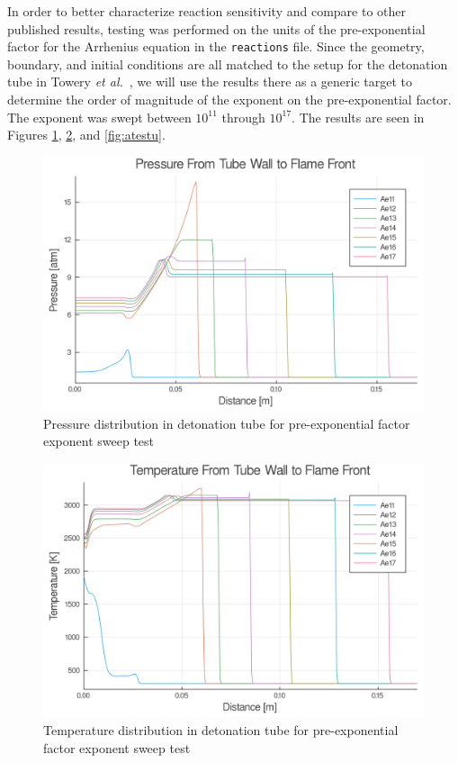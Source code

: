 In order to better characterize reaction sensitivity and compare to other published results, testing was performed on the units of the pre-exponential factor for the Arrhenius equation in the \verb|reactions| file. Since the geometry, boundary, and initial conditions are all matched to the setup for the detonation tube in Towery \textit{et al.}~\cite{towery1}, we will use the results there as a generic target to determine the order of magnitude of the exponent on the pre-exponential factor. The exponent was swept between \(10^{11}\) through \(10^{17}\). The results are seen in Figures \ref{fig:atestp}, \ref{fig:atestt}, and \ref{fig:atestu}. 

\begin{figure}
\centering
\includegraphics[width=0.85\linewidth]{./figs/Atest/p.png}
\caption{Pressure distribution in detonation tube for pre-exponential factor exponent sweep test}
\label{fig:atestp}
\end{figure}

\begin{figure}
\centering
\includegraphics[width=0.85\linewidth]{./figs/Atest/t.png}
\caption{Temperature distribution in detonation tube for pre-exponential factor exponent sweep test}
\label{fig:atestt}
\end{figure}

